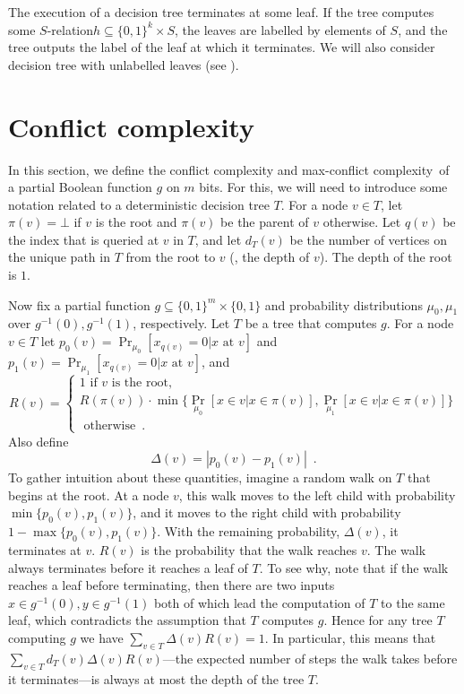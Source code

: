 \documentclass{toc}
\newcommand{\relation}{$S$-relation\xspace}     %
\newcommand{\ccc}{max-conflict complexity}
\begin{document}
The execution of a decision tree terminates at some leaf. If the tree computes some \relation $h \subseteq \{0,1\}^k \times S$, the leaves are labelled by elements of $S$, and the tree outputs the label of the leaf at which it terminates. We will also consider decision tree with unlabelled leaves (see ).
%
\section{Conflict complexity}  
\label{sec:conflict}
In this section, we define the conflict complexity and \ccc \ of a partial Boolean function $g$ on $m$ bits.  For this, we will need to introduce some notation related to a deterministic decision tree $T$.  
For a node $v \in T$, let $\pi(v) = \bot$ if $v$ is the root and $\pi(v)$ be the parent of $v$ otherwise.  Let $q(v)$ be the index that 
is queried at $v$ in $T$, and let $d_T(v)$ be the number of vertices on the unique path in $T$ from the root to $v$ (\ie, the depth of $v$). The depth of the root is $1$.

Now fix a partial function $g \subseteq \{0,1\}^m \times \{0,1\}$ and probability distributions $\mu_0, \mu_1$ over $g^{-1}(0), g^{-1}(1)$, respectively.  Let $T$ 
be a tree that computes $g$.  For a node $v \in T$ let $p_0(v) =  \Pr_{\mu_0}[x_{q(v)}=0 | x \mbox{ at } v]$ and $p_1(v) = \Pr_{\mu_1}[x_{q(v)}=0 | x \mbox{ at } v]$, and 
\[
R(v) = 
\begin{cases}
1\mbox{ \ \ \ \ \ \ \ \ \ \ \ \ \ \ \ \ \ \ \ \ \ if } v \mbox{ is the root,} \\
R(\pi(v))\cdot \min\{\Pr_{\mu_0}[x \in v | x \in \pi(v)], \Pr_{\mu_1}[x \in v | x \in \pi(v)]\} \\
\mbox{\ \ \ \ \ \ \ \ \ \ \ \ \ \ \ \ \ \ \ \ \ \ \ \ otherwise}\enspace.
\end{cases}
\]
Also define
\[
\Delta(v) = |p_0(v) -  p_1(v)| \enspace .
\]
To gather intuition about these quantities, imagine a random walk on $T$ that begins at the root.  At a node $v$, this walk moves to the left child with probability 
$\min\{p_0(v), p_1(v) \}$, and it moves to the right child with probability 
$1- \max\{p_0(v), p_1(v) \}$.  With the remaining probability, $\Delta(v)$, it terminates at $v$. $R(v)$ is the probability that the walk reaches $v$.
The walk always terminates before it reaches a leaf of $T$. To see why, note that if the walk reaches a leaf before terminating, then there are two inputs $x \in g^{-1}(0), y \in g^{-1}(1)$ both of which lead the computation of $T$ to the same leaf, which contradicts the assumption that $T$ computes $g$. Hence for any tree $T$ computing $g$ we have $\sum_{v \in T} \Delta(v) R(v)=1$.
In particular, this means that $\sum_{v \in T} d_T(v) \Delta(v) R(v)$---the expected number of steps the walk takes before it terminates---is always at most the depth 
of the tree $T$.
\end{document}
